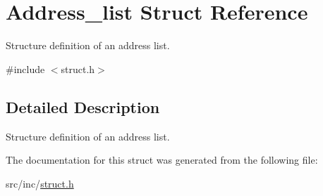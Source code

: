 \hypertarget{struct_address__list}{}\section{Address\+\_\+list Struct Reference}
\label{struct_address__list}


Structure definition of an address list.  




{\ttfamily \#include $<$struct.\+h$>$}



\subsection{Detailed Description}
Structure definition of an address list. 

The documentation for this struct was generated from the following file\+:\begin{DoxyCompactItemize}
\item 
src/inc/\mbox{\hyperlink{struct_8h}{struct.\+h}}\end{DoxyCompactItemize}
